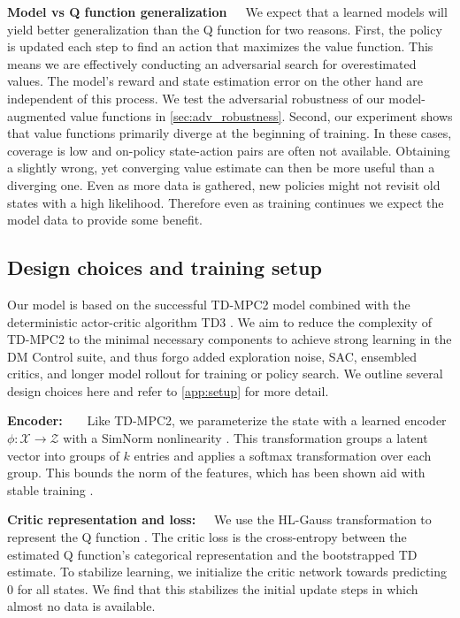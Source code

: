 \textbf{Model vs Q function generalization}~~~We expect that a learned models will yield better generalization than the Q function for two reasons.
First, the policy is updated each step to find an action that maximizes the value function.
This means we are effectively conducting an adversarial search for overestimated values.
The model's reward and state estimation error on the other hand are independent of this process.
We test the adversarial robustness of our model-augmented value functions in \autoref{sec:adv_robustness}.
Second, our experiment shows that value functions primarily diverge at the beginning of training.
In these cases, coverage is low and on-policy state-action pairs are often not available.
Obtaining a slightly wrong, yet converging value estimate can then be more useful than a diverging one. 
Even as more data is gathered, new policies might not revisit old states with a high likelihood.
Therefore even as training continues we expect the model data to provide some benefit.

\subsection{Design choices and training setup}
\label{sec:method}

Our model is based on the successful TD-MPC2 model \parencite{hansen2024tdmpc} combined with the deterministic actor-critic algorithm TD3 \parencite{fujimoto2018addressing}.
We aim to reduce the complexity of TD-MPC2 to the minimal necessary components to achieve strong learning in the DM Control suite, and thus forgo added exploration noise, SAC, ensembled critics, and longer model rollout for training or policy search. We outline several design choices here and refer to \autoref{app:setup} for more detail.

\textbf{Encoder:}~~~~Like TD-MPC2, we parameterize the state with a learned encoder $\phi: \mathcal{X} \rightarrow \mathcal{Z}$ with a SimNorm nonlinearity \parencite{lavoie2023simplicial}. 
This transformation groups a latent vector into groups of $k$ entries and applies a softmax transformation over each group.
This bounds the norm of the features, which has been shown aid with stable training \parencite{hussing2024dissecting,nauman2024overestimation}.

\textbf{Critic representation and loss:}~~~We use the HL-Gauss transformation to represent the Q function \parencite{farebrother2024stop}. The critic loss is the cross-entropy between the estimated Q function's categorical representation and the bootstrapped TD estimate.
To stabilize learning, we initialize the critic network towards predicting $0$ for all states.
We find that this stabilizes the initial update steps in which almost no data is available.


